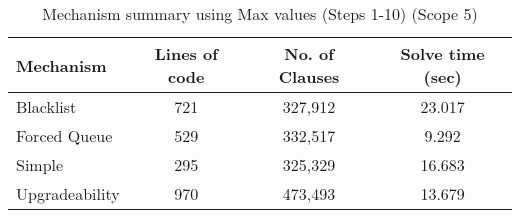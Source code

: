 \begin{table}[htbp]
\centering
\begin{tabular}{|l|c|c|c|}
\hline
\textbf{Mechanism} & \textbf{Lines of code} & \textbf{No. of Clauses} & \textbf{Solve time (sec)} \\
\hline
Blacklist & 721 & 327,912 & 23.017 \\
Forced Queue & 529 & 332,517 & 9.292 \\
Simple & 295 & 325,329 & 16.683 \\
Upgradeability & 970 & 473,493 & 13.679 \\
\hline
\end{tabular}
\caption{Mechanism summary using Max values (Steps 1-10) (Scope 5)}
\label{tab:mechanism_summary_max_steps_10}
\end{table}